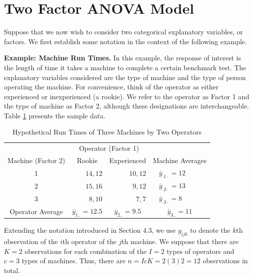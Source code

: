 \section{Two Factor ANOVA Model}

Suppose that we now wish to consider two categorical explanatory
variables, or factors. We first establish some notation in the
context of the following example.

\linejed

\textbf{Example: Machine Run Times.} In this example, the response
of interest is the length of time it takes a machine to complete a
certain benchmark test. The explanatory variables considered are the
type of machine and the type of person operating the machine. For
convenience, think of the operator as either experienced or
inexperienced (a rookie). We refer to the operator as Factor 1 and
the type of machine as Factor 2, although these designations are
interchangeable. Table \ref{T4:MachineTimes} presents the sample
data.

  \begin{center}  \begin{table}[h]
\caption{\label{T4:MachineTimes} Hypothetical Run Times of Three
Machines by Two Operators}
\begin{tabular}{cccc}
\hline & \multicolumn{2}{c}{Operator (Factor 1)} &  \\ \cline{2-3}
Machine (Factor 2) & Rookie & Experienced & Machine Averages \\
\hline 1 & \multicolumn{1}{r}{$14,12$} & \multicolumn{1}{r}{$10,12$}
&
\multicolumn{1}{l}{$\ \ \ \ \bar{y}_{\cdot 1\cdot }=12$} \\
2 & \multicolumn{1}{r}{$15,16$} & \multicolumn{1}{r}{$9,12$} &
\multicolumn{1}{l}{$\ \ \ \ \bar{y}_{\cdot 2\cdot }=13$} \\
3 & \multicolumn{1}{r}{$8,10$} & \multicolumn{1}{r}{$7,7$} &
\multicolumn{1}{l}{$\ \ \ \ \bar{y}_{\cdot 3\cdot }=8$} \\ \hline
Operator Average & $\bar{y}_{1..}=12.5$ & $\bar{y}_{2..}=9.5$ & $\bar{y}%
_{3..}=11$ \\ \hline
\end{tabular}

\end{table}  \end{center}  


Extending the notation introduced in Section 4.3, we use $y_{ijk}$
to denote the $k$th observation of the $i$th operator of the $j$th
machine. We suppose that there are $K=2$ observations for each
combination of the $I=2$ types of operators and $c=3$ types of
machines. Thus, there are $n=IcK=2(3)2=12$ observations in total.

